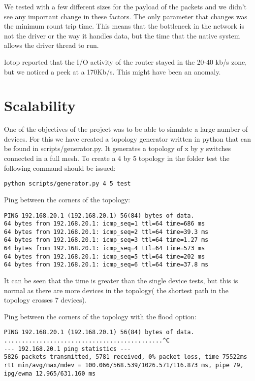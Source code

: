 We tested with a few different sizes for the payload of the packets and we didn't see any important change in these
factors. The only parameter that changes was the minimum rount trip time.
This means that the bottleneck in the network is not the driver or the way it handles data, but the time
that the native system allows the driver thread to run.

Iotop reported that the I/O activity of the router stayed in the 20-40 kb/s zone, but we noticed a peek
at a 170Kb/s. This might have been an anomaly.

\section{Scalability}
\label{sec:scalability}

One of the objectives of the project was to be able to simulate a large number of devices. For this we have
created a topology generator written in python that can be found in scripts/generator.py. It generates a topology of
x by y switches connected in a full mesh. To create a 4 by 5 topology in the folder test the following command
should be issued:
\lstset{language=text, caption=Generating a topology}
\begin{lstlisting}
python scripts/generator.py 4 5 test
\end{lstlisting}

Ping between the corners of the topology:

\lstset{language=text, caption=Ping}
\begin{lstlisting}
PING 192.168.20.1 (192.168.20.1) 56(84) bytes of data.
64 bytes from 192.168.20.1: icmp_seq=1 ttl=64 time=686 ms
64 bytes from 192.168.20.1: icmp_seq=2 ttl=64 time=39.3 ms
64 bytes from 192.168.20.1: icmp_seq=3 ttl=64 time=1.27 ms
64 bytes from 192.168.20.1: icmp_seq=4 ttl=64 time=573 ms
64 bytes from 192.168.20.1: icmp_seq=5 ttl=64 time=202 ms
64 bytes from 192.168.20.1: icmp_seq=6 ttl=64 time=37.8 ms
\end{lstlisting}
It can be seen that the time is greater than the single device
tests, but this is normal as there are more devices in the topology(
the shortest path in the topology crosses 7 devices).

Ping between the corners of the topology with the flood option:
\lstset{language=text, caption=Ping}
\begin{lstlisting}
PING 192.168.20.1 (192.168.20.1) 56(84) bytes of data.
.............................................^C                                
--- 192.168.20.1 ping statistics ---
5826 packets transmitted, 5781 received, 0% packet loss, time 75522ms
rtt min/avg/max/mdev = 100.066/568.539/1026.571/116.873 ms, pipe 79, ipg/ewma 12.965/631.160 ms
\end{lstlisting}

